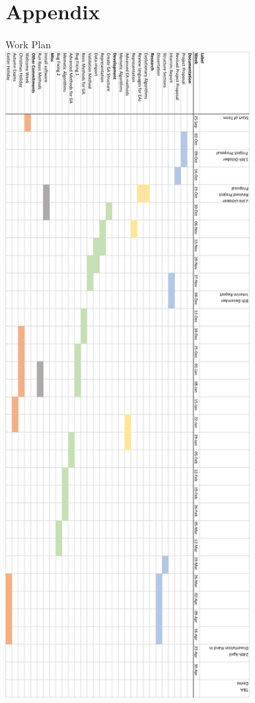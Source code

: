 \documentclass[a4paper]{article}
\begin{document}
\section{Appendix}
\nocite{*}



\clearpage
\begin{center}
    \Large{Work Plan}\\
\includegraphics[height=24.8cm]{workPlanOLD.png}
\end{center}
\end{document}
